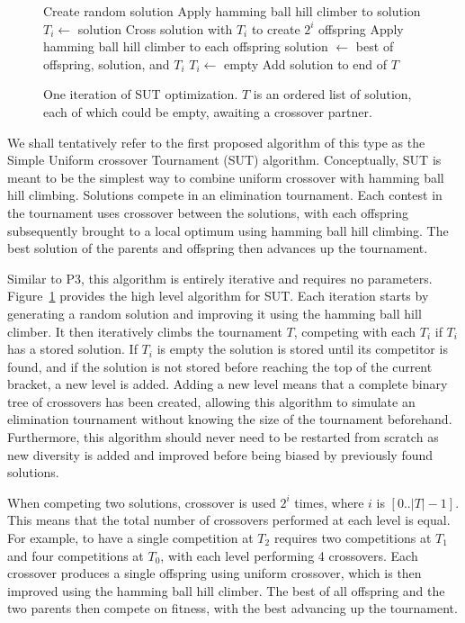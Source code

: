 \begin{figure}
  \begin{algorithmic}[1]
    \State Create random solution
    \State Apply hamming ball hill climber to solution
        \State $T_i \leftarrow$ solution
        \State \Return
      \EndIf
      \State Cross solution with $T_i$ to create $2^i$ offspring
      \State Apply hamming ball hill climber to each offspring
      \State solution $\leftarrow$ best of offspring, solution, and $T_i$
      \State $T_i \leftarrow$ empty
    \EndFor
    \State Add solution to end of $T$
  \EndProcedure
\end{algorithmic}
  \caption{One iteration of SUT optimization. $T$ is an
           ordered list of solution, each of which could be empty,
           awaiting a crossover partner.}
  \label{fig-sut}
\end{figure}


We shall tentatively refer to the first proposed algorithm of this type as the Simple Uniform crossover Tournament (SUT)
algorithm. Conceptually, SUT is meant to be the simplest way to combine uniform crossover with hamming ball hill climbing.
Solutions compete in an elimination tournament. Each contest in the tournament uses crossover between the solutions, with each
offspring subsequently brought to a local optimum using hamming ball hill climbing. The best solution of the parents and offspring then
advances up the tournament.

Similar to P3, this algorithm is entirely iterative and requires no parameters. Figure~\ref{fig-sut} provides the high level algorithm
for SUT. Each iteration starts by generating a random solution and improving it using the hamming ball hill climber. It then
iteratively climbs the tournament $T$, competing with each $T_i$ if $T_i$ has a stored solution. If $T_i$ is empty the solution
is stored until its competitor is found, and if the solution is not stored before reaching the top of the current bracket, a new
level is added. Adding a new level means that a complete binary tree of crossovers has been created, allowing this algorithm
to simulate an elimination tournament without knowing the size of the tournament beforehand. Furthermore, this algorithm should
never need to be restarted from scratch as new diversity is added and improved before being biased by previously found solutions.

When competing two solutions, crossover is used $2^i$ times, where $i$ is $[0..|T|-1]$. This means that the total number of crossovers
performed at each level is equal. For example, to have a single competition at $T_2$ requires two competitions at $T_1$ and four
competitions at $T_0$, with each level performing 4 crossovers.
Each crossover produces a single offspring using uniform crossover, which is then improved using
the hamming ball hill climber. The best of all offspring and the two parents then compete on fitness, with the best advancing
up the tournament.

